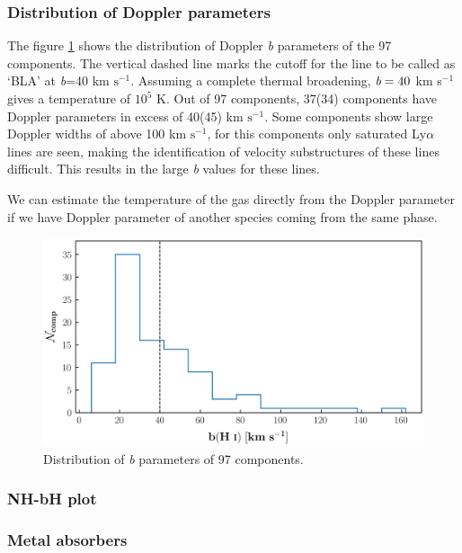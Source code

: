 \subsubsection*{Distribution of Doppler parameters}

The figure \ref{fig:b_HI_distribution} shows the distribution of Doppler \emph{b} parameters of the 97  components. The vertical dashed line marks the cutoff for the line to be called as `BLA' at \emph{b}=40 km $\text{s}^{-1}$. Assuming a complete thermal broadening, $\emph{b}=40$ km s$^{-1}$ gives a temperature of $10^5$ K. Out of 97 components, 37(34) components have Doppler parameters in excess of 40(45) km $\text{s}^{-1}$. Some components show large Doppler widths of above 100 km $\text{s}^{-1}$, for this components only saturated Ly$\alpha$ lines are seen, making the identification of velocity substructures of these lines difficult. This results in the large \emph{b} values for these lines. 

We can estimate the temperature of the gas directly from the Doppler parameter if we have Doppler parameter of another species coming from the same phase. 

\begin{figure}
    \centering
    \includegraphics[width=\linewidth]{Figures/b_HI_distribution_survey.png}
    \caption{Distribution of \emph{b} parameters of 97  components.}
    \label{fig:b_HI_distribution} 
\end{figure}


\subsubsection*{NH-bH plot}

\subsubsection{Metal absorbers}

